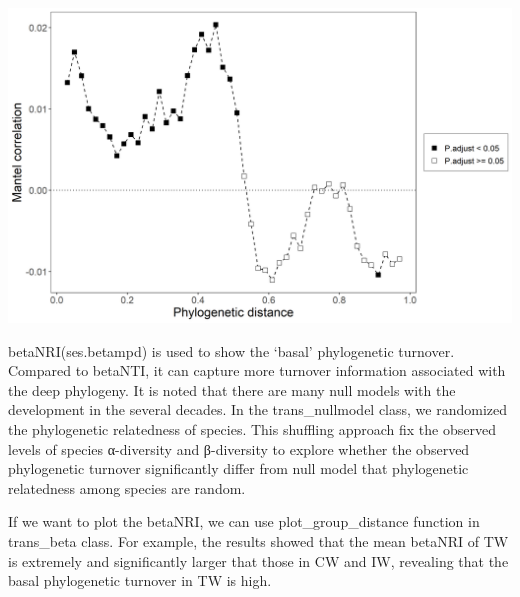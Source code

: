 \documentclass[
]{book}
\newenvironment{Shaded}{\begin{snugshade}}{\end{snugshade}}
\newcommand{\AttributeTok}[1]{\textcolor[rgb]{0.77,0.63,0.00}{#1}}
\newcommand{\CommentTok}[1]{\textcolor[rgb]{0.56,0.35,0.01}{\textit{#1}}}
\newcommand{\ConstantTok}[1]{\textcolor[rgb]{0.00,0.00,0.00}{#1}}
\newcommand{\DecValTok}[1]{\textcolor[rgb]{0.00,0.00,0.81}{#1}}
\newcommand{\FunctionTok}[1]{\textcolor[rgb]{0.00,0.00,0.00}{#1}}
\newcommand{\NormalTok}[1]{#1}
\newcommand{\SpecialCharTok}[1]{\textcolor[rgb]{0.00,0.00,0.00}{#1}}
\begin{document}
\begin{center}\includegraphics[width=600px]{Images/plot_mantel_corr} \end{center}

betaNRI(ses.betampd) is used to show the `basal' phylogenetic turnover\citep{Liu_Long_term_2017}.
Compared to betaNTI, it can capture more turnover information associated with the deep phylogeny.
It is noted that there are many null models with the development in the several decades.
In the trans\_nullmodel class, we randomized the phylogenetic relatedness of species.
This shuffling approach fix the observed levels of species α-diversity and β-diversity to
explore whether the observed phylogenetic turnover significantly differ from null model that phylogenetic relatedness among species are random.

\begin{Shaded}
\end{Shaded}

If we want to plot the betaNRI, we can use plot\_group\_distance function in trans\_beta class.
For example, the results showed that the mean betaNRI of TW is extremely and significantly larger that those in CW and IW,
revealing that the basal phylogenetic turnover in TW is high.
\end{document}
